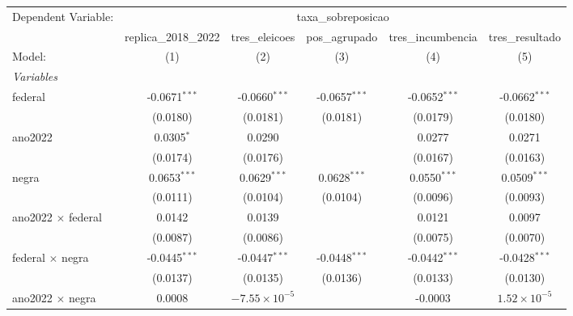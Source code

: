 
\begingroup
\centering
\begin{tabular}{lccccc}
   \tabularnewline \midrule \midrule
   Dependent Variable: & \multicolumn{5}{c}{taxa\_sobreposicao}\\
                                             & replica\_2018\_2022   & tres\_eleicoes         & pos\_agrupado   & tres\_incumbencia  & tres\_resultado \\    
   Model:                                    & (1)                   & (2)                    & (3)             & (4)                & (5)\\  
   \midrule
   \emph{Variables}\\
   federal                                   & -0.0671$^{***}$       & -0.0660$^{***}$        & -0.0657$^{***}$ & -0.0652$^{***}$    & -0.0662$^{***}$\\   
                                             & (0.0180)              & (0.0181)               & (0.0181)        & (0.0179)           & (0.0180)\\   
   ano2022                                   & 0.0305$^{*}$          & 0.0290                 &                 & 0.0277             & 0.0271\\   
                                             & (0.0174)              & (0.0176)               &                 & (0.0167)           & (0.0163)\\   
   negra                                     & 0.0653$^{***}$        & 0.0629$^{***}$         & 0.0628$^{***}$  & 0.0550$^{***}$     & 0.0509$^{***}$\\   
                                             & (0.0111)              & (0.0104)               & (0.0104)        & (0.0096)           & (0.0093)\\   
   ano2022 $\times$ federal                  & 0.0142                & 0.0139                 &                 & 0.0121             & 0.0097\\   
                                             & (0.0087)              & (0.0086)               &                 & (0.0075)           & (0.0070)\\   
   federal $\times$ negra                    & -0.0445$^{***}$       & -0.0447$^{***}$        & -0.0448$^{***}$ & -0.0442$^{***}$    & -0.0428$^{***}$\\   
                                             & (0.0137)              & (0.0135)               & (0.0136)        & (0.0133)           & (0.0130)\\   
   ano2022 $\times$ negra                    & 0.0008                & $-7.55\times 10^{-5}$  &                 & -0.0003            & $1.52\times 10^{-5}$\\    

\end{tabular}
